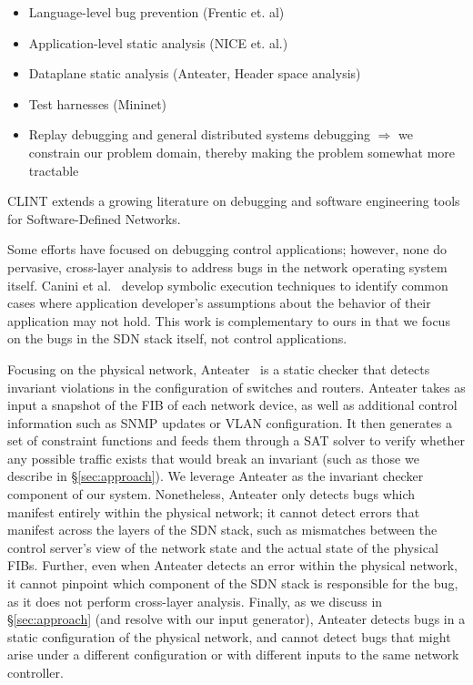 
\begin{itemize}


\item Language-level bug prevention (Frentic et. al)
\item Application-level static analysis (NICE et. al.)
\item Dataplane static analysis (Anteater, Header space analysis)
\item Test harnesses (Mininet)
\item Replay debugging and general distributed systems debugging $\Rightarrow$ we constrain our problem domain, thereby making the problem somewhat more tractable

\end{itemize}

CLINT extends a growing literature on debugging and software engineering tools for Software-Defined Networks.
    
Some efforts have focused on debugging control applications; however, none do pervasive,
cross-layer analysis to address bugs in the network operating system itself. 
Canini et al.~\cite{canini} develop symbolic execution techniques to identify
common cases where application developer's assumptions about the behavior of
their application may not hold. This work is complementary to ours in
that we focus on the bugs in the SDN stack itself, not control applications.

Focusing on the physical network, Anteater~\cite{anteater} is a static checker that
detects invariant violations in the configuration of switches and routers.
Anteater takes as input a snapshot of the FIB of each network device, as well as
additional control information such as SNMP updates or VLAN configuration. It then
generates a set of constraint functions and feeds them through a SAT solver to verify whether
any possible traffic exists that would break an invariant (such as those we describe in \S\ref{sec:approach}).
We leverage
Anteater as the invariant checker component of our system.
Nonetheless, Anteater only detects bugs which manifest entirely within the physical network;  
it cannot detect errors that manifest across the layers of the SDN stack, such as mismatches
between the control server's view of the network state and the actual state of the
physical FIBs. Further, even when Anteater detects an error within the physical network, it cannot pinpoint
which component of the SDN stack is responsible for the bug, as it does not perform cross-layer
analysis. Finally, as we discuss in \S\ref{sec:approach} (and resolve with our input generator), 
Anteater detects bugs in a static configuration
of the physical network, and cannot detect bugs that might arise under a different configuration or with different
inputs to the same network controller.

